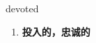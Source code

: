 
\begin{frame}
{\huge devoted}
\begin{center}
\begin{enumerate}\Large
  \item \textbf{投入的，忠诚的}
\end{enumerate}
\end{center}
\end{frame}
